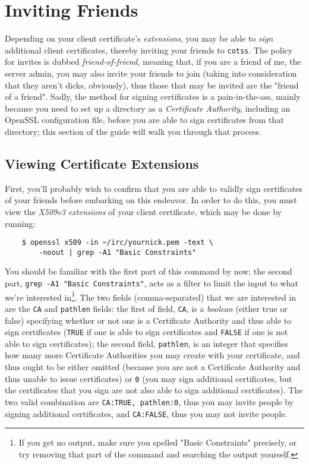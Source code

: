 \documentclass{article}
\begin{document}
{\section{Inviting Friends}
Depending on your client certificate's \textit{extensions}, you may be able to \textit{sign} additional client certificates, thereby inviting your friends to \texttt{cotss}.  The policy for invites is dubbed \textit{friend-of-friend}, meaning that, if you are a friend of me, the server admin, you may also invite your friends to join (taking into consideration that they aren't dicks, obviously), thus those that may be invited are the "friend of a friend".  Sadly, the method for signing certificates is a pain-in-the-ass, mainly because you need to set up a directory as a \textit{Certificate Authority}, including an OpenSSL configuration file,  before you are able to sign certificates from that directory; this section of the guide will walk you through that process.

\subsection{Viewing Certificate Extensions}
First, you'll probably wish to confirm that you are able to validly sign certificates of your friends before embarking on this endeavor.  In order to do this, you must view the \textit{X509v3 extensions} of your client certificate, which may be done by running:
\begin{lstlisting}
    $ openssl x509 -in ~/irc/yournick.pem -text \
        -noout | grep -A1 "Basic Constraints"
\end{lstlisting}
You should be familiar with the first part of this command by now; the second part, \texttt{grep -A1 "Basic Constraints"}, acts as a filter to limit the input to what we're interested in\footnote{If you get no output, make sure you spelled "Basic Constraints" precisely, or try removing that part of the command and searching the output yourself.}.  The two fields (comma-separated) that we are interested in are the \texttt{CA} and \texttt{pathlen} fields: the first of field, \texttt{CA}, is a \textit{boolean} (either true or false) specifying whether or not one is a Certificate Authority and thus able to sign certificates (\texttt{TRUE} if one is able to sign certificates and \texttt{FALSE} if one is not able to sign certificates); the second field, \texttt{pathlen}, is an integer that specifies how many more Certificate Authorities you may create with your certificate, and thus ought to be either omitted (because you are not a Certificate Authority and thus unable to issue certificates) or \texttt{0} (you may sign additional certificates, but the certificates that you sign are not also able to sign additional certificates).  The two valid combination are \texttt{CA:TRUE, pathlen:0}, thus you may invite people by signing additional certificates, and \texttt{CA:FALSE}, thus you may not invite people.

}
\end{document}
